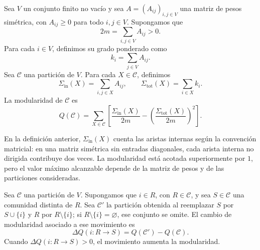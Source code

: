             \begin{definicion}[Modularidad]
                Sea $V$ un conjunto finito no vacío y sea $A=(A_{ij})_{i,j\in V}$ una matriz de pesos simétrica, con $A_{ij}\ge 0$ para todo $i,j\in V$. Supongamos que
                \[
                    2m=\sum_{i,j\in V}A_{ij}>0.
                \]
                Para cada $i\in V$, definimos su grado ponderado como
                \[
                    k_i=\sum_{j\in V}A_{ij}.
                \]
                Sea $\mathcal{C}$ una partición de $V$. Para cada $X\in\mathcal{C}$, definimos
                \[
                    \Sigma_{\mathrm{in}}(X)=\sum_{i,j\in X}A_{ij},
                    \qquad
                    \Sigma_{\mathrm{tot}}(X)=\sum_{i\in X}k_i.
                \]
                La modularidad de $\mathcal{C}$ es
                \[
                Q(\mathcal{C})=
                \sum_{X\in\mathcal{C}}
                \left[
                    \frac{\Sigma_{\mathrm{in}}(X)}{2m}
                    -
                    \left(\frac{\Sigma_{\mathrm{tot}}(X)}{2m}\right)^2
                \right].
                \]
            \end{definicion}

            \begin{observacion}
                En la definición anterior, $\Sigma_{\mathrm{in}}(X)$ cuenta las aristas internas según la convención matricial: en una matriz simétrica sin entradas diagonales, cada arista interna no dirigida contribuye dos veces. La modularidad está acotada superiormente por $1$, pero el valor máximo alcanzable depende de la matriz de pesos y de las particiones consideradas.
            \end{observacion}

            \begin{definicion}
                Sea $\mathcal{C}$ una partición de $V$. Supongamos que $i\in R$, con $R\in\mathcal{C}$, y sea $S\in\mathcal{C}$ una comunidad distinta de $R$. Sea $\mathcal{C}'$ la partición obtenida al reemplazar $S$ por $S\cup\{i\}$ y $R$ por $R\setminus\{i\}$; si $R\setminus\{i\}=\varnothing$, ese conjunto se omite. El cambio de modularidad asociado a ese movimiento es
                \[
                    \Delta Q(i:R\to S)=Q(\mathcal{C}')-Q(\mathcal{C}).
                \]
                Cuando $\Delta Q(i:R\to S)>0$, el movimiento aumenta la modularidad.
            \end{definicion}

